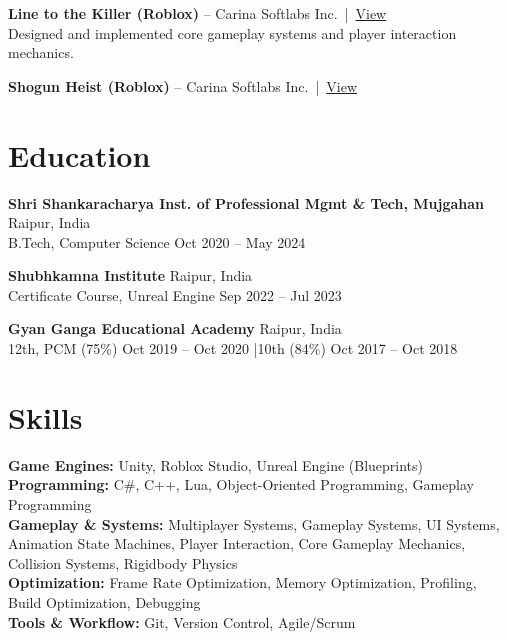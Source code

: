 \documentclass[a4paper,10pt]{article}
\begin{document}
\textbf{Line to the Killer (Roblox)} -- Carina Softlabs Inc. \,|\, \href{https://www.roblox.com/games/138556890590066/Line-to-the-Killer}{View}\\[1pt]
Designed and implemented core gameplay systems and player interaction mechanics.
\vspace{4pt}

\textbf{Shogun Heist (Roblox)} -- Carina Softlabs Inc. \,|\, \href{https://www.roblox.com/games/111093934039629/Shogun-Heist}{View}

\section*{Education}
\textbf{Shri Shankaracharya Inst. of Professional Mgmt \& Tech, Mujgahan} \hfill Raipur, India\\
B.Tech, Computer Science \hfill Oct 2020 -- May 2024
\vspace{3pt}

\textbf{Shubhkamna Institute} \hfill Raipur, India\\
Certificate Course, Unreal Engine \hfill Sep 2022 -- Jul 2023
\vspace{3pt}

\textbf{Gyan Ganga Educational Academy} \hfill Raipur, India\\
12th, PCM (75\%) \hfill Oct 2019 -- Oct 2020 \quad|\quad 10th (84\%) \hfill Oct 2017 -- Oct 2018

\section*{Skills}
\textbf{Game Engines:} Unity, Roblox Studio, Unreal Engine (Blueprints)\\
\textbf{Programming:} C\#, C++, Lua, Object-Oriented Programming, Gameplay Programming\\
\textbf{Gameplay \& Systems:} Multiplayer Systems, Gameplay Systems, UI Systems, Animation State Machines, Player Interaction, Core Gameplay Mechanics, Collision Systems, Rigidbody Physics\\
\textbf{Optimization:} Frame Rate Optimization, Memory Optimization, Profiling, Build Optimization, Debugging\\
\textbf{Tools \& Workflow:} Git, Version Control, Agile/Scrum
\end{document}
